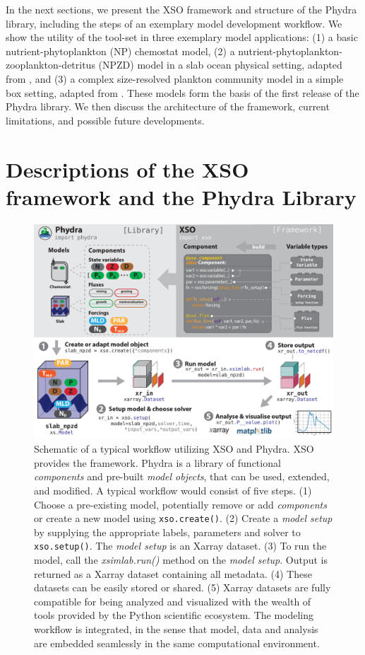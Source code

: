 \documentclass[gmd, manuscript]{copernicus}
\begin{document}
In the next sections, we present the XSO framework and structure of the Phydra library, including the steps of an exemplary model development workflow. We show the utility of the tool-set in three exemplary model applications: (1) a basic nutrient-phytoplankton (NP) chemostat model, (2) a nutrient-phytoplankton-zooplankton-detritus (NPZD) model in a slab ocean physical setting, adapted from \citet{Anderson2015c}, and (3) a complex size-resolved plankton community model in a simple box setting, adapted from \citet{Banas2011b}. These models form the basis of the first release of the Phydra library. We then discuss the architecture of the framework, current limitations, and possible future developments.


\section{Descriptions of the XSO framework and the Phydra Library} \label{Section:phydrapackage}
%
\begin{figure}[t]
\includegraphics[width=12cm]{Figures/firstdraft_schematics/00_schematics_Package.pdf}
\caption{Schematic of a typical workflow utilizing XSO and Phydra. XSO provides the framework. Phydra is a library of functional \textit{components} and pre-built \textit{model objects}, that can be used, extended, and modified. A typical workflow would consist of five steps. (1) Choose a pre-existing model, potentially remove or add \textit{components} or create a new model using \texttt{xso.create()}. (2) Create a \textit{model setup} by supplying the appropriate labels, parameters and solver to \texttt{xso.setup()}. The \textit{model setup} is an Xarray dataset. (3) To run the model, call the \textit{xsimlab.run()} method on the \textit{model setup}. Output is returned as a Xarray dataset containing all metadata. (4) These datasets can be easily stored or shared. (5) Xarray datasets are fully compatible for being analyzed and visualized with the wealth of tools provided by the Python scientific ecosystem. The modeling workflow is integrated, in the sense that model, data and analysis are embedded seamlessly in the same computational environment. }
\label{Figure:PhydraXSOPackageSchematics}
\end{figure}
\end{document}
